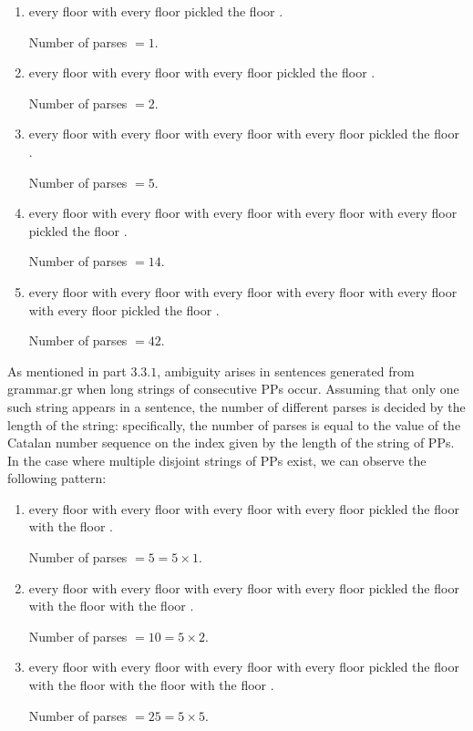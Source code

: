 \documentclass[11pt]{article}
\begin{document}
\begin{enumerate}[label=(\arabic*)]
      \item every floor with every floor pickled the floor .

            Number of parses $= 1$.
      \item every floor with every floor with every floor pickled the floor .

            Number of parses $= 2$.
      \item every floor with every floor with every floor with every floor pickled the floor .

            Number of parses $= 5$.
      \item every floor with every floor with every floor with every floor with every floor pickled the floor .

            Number of parses $= 14$.

      \item every floor with every floor with every floor with every floor with every floor with every floor pickled the floor .

            Number of parses $= 42$.
\end{enumerate}

As mentioned in part $3.3.1$, ambiguity arises in sentences generated from grammar.gr when long strings of consecutive PPs occur. Assuming that only one such string appears in a sentence, the number of different parses is decided by the length of the string: specifically, the number of parses is equal to the value of the Catalan number sequence on the index given by the length of the string of PPs. In the case where multiple disjoint strings of PPs exist, we can observe the following pattern:

\begin{enumerate}[label=(\arabic*)]
      \item every floor with every floor with every floor with every floor pickled the floor with the floor .

            Number of parses $= 5 = 5 \times 1$.

      \item every floor with every floor with every floor with every floor pickled the floor with the floor with the floor .

            Number of parses $= 10 = 5 \times 2$.

      \item every floor with every floor with every floor with every floor pickled the floor with the floor with the floor with the floor .

            Number of parses $= 25 = 5 \times 5$.
\end{enumerate}
\end{document}
